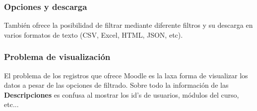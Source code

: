 \subsubsection{Opciones y descarga}
También ofrece la posibilidad de filtrar mediante diferente filtros y su descarga en varios formatos de texto (CSV, Excel, HTML, JSON, etc).

\subsubsection{Problema de visualización}

El problema de los registros que ofrece Moodle es la laxa forma de visualizar los datos a pesar de las opciones de filtrado. Sobre todo la información de las \textbf{Descripciones} es confusa al mostrar los id's de usuarios, módulos del curso, etc...




